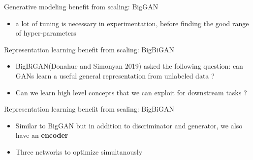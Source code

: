 \begin{frame}{Generative modeling benefit from scaling: BigGAN}
\protect\hypertarget{generative-modeling-benefit-from-scaling-biggan-3}{}

\begin{itemize}
\tightlist
\item
  a lot of tuning is necessary in experimentation, before finding the
  good range of hyper-parameters
\end{itemize}


\end{frame}

\begin{frame}{Representation learning benefit from scaling: BigBiGAN}
\protect\hypertarget{representation-learning-benefit-from-scaling-bigbigan}{}

\begin{itemize}
\tightlist
\item
  BigBiGAN(Donahue and Simonyan 2019) asked the following question: can
  GANs learn a useful general representation from unlabeled data ?
\item
  Can we learn high level concepts that we can exploit for downstream
  tasks ?
\end{itemize}

\end{frame}

\begin{frame}{Representation learning benefit from scaling: BigBiGAN}
\protect\hypertarget{representation-learning-benefit-from-scaling-bigbigan-1}{}

\begin{itemize}
\tightlist
\item
  Similar to BigGAN but in addition to discriminator and generator, we
  also have an \textbf{encoder}
\item
  Three networks to optimize simultanously
\end{itemize}


\end{frame}

